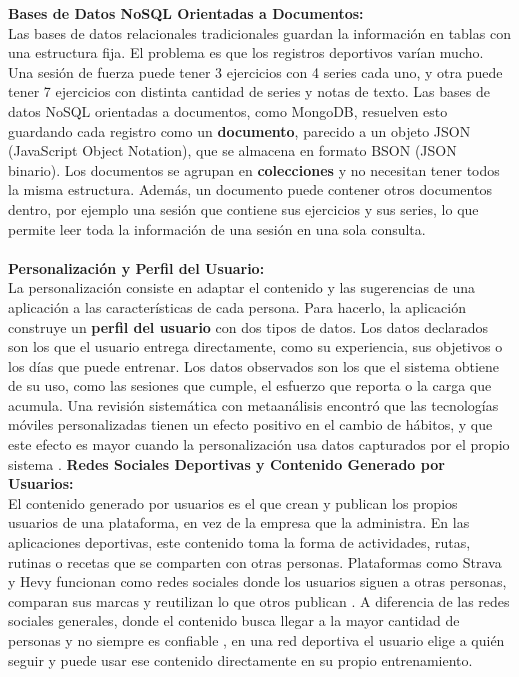 \vspace{0.3cm}
\textbf{Bases de Datos NoSQL Orientadas a Documentos:}\\
Las bases de datos relacionales tradicionales guardan la información en tablas con una estructura fija. El problema es que los registros deportivos varían mucho. Una sesión de fuerza puede tener 3 ejercicios con 4 series cada uno, y otra puede tener 7 ejercicios con distinta cantidad de series y notas de texto. Las bases de datos NoSQL orientadas a documentos, como MongoDB, resuelven esto guardando cada registro como un \textbf{documento}, parecido a un objeto JSON (JavaScript Object Notation), que se almacena en formato BSON (JSON binario). Los documentos se agrupan en \textbf{colecciones} y no necesitan tener todos la misma estructura. Además, un documento puede contener otros documentos dentro, por ejemplo una sesión que contiene sus ejercicios y sus series, lo que permite leer toda la información de una sesión en una sola consulta.
\\\\
\textbf{Personalización y Perfil del Usuario:}\\
La personalización consiste en adaptar el contenido y las sugerencias de una aplicación a las características de cada persona. Para hacerlo, la aplicación construye un \textbf{perfil del usuario} con dos tipos de datos. Los datos declarados son los que el usuario entrega directamente, como su experiencia, sus objetivos o los días que puede entrenar. Los datos observados son los que el sistema obtiene de su uso, como las sesiones que cumple, el esfuerzo que reporta o la carga que acumula. Una revisión sistemática con metaanálisis encontró que las tecnologías móviles personalizadas tienen un efecto positivo en el cambio de hábitos, y que este efecto es mayor cuando la personalización usa datos capturados por el propio sistema \citep{tong2021personalized}.
\textbf{Redes Sociales Deportivas y Contenido Generado por Usuarios:}\\
El contenido generado por usuarios es el que crean y publican los propios usuarios de una plataforma, en vez de la empresa que la administra. En las aplicaciones deportivas, este contenido toma la forma de actividades, rutas, rutinas o recetas que se comparten con otras personas. Plataformas como Strava y Hevy funcionan como redes sociales donde los usuarios siguen a otras personas, comparan sus marcas y reutilizan lo que otros publican \citep{strava_segments, hevy_social}. A diferencia de las redes sociales generales, donde el contenido busca llegar a la mayor cantidad de personas y no siempre es confiable \citep{sabbagh2020credibility}, en una red deportiva el usuario elige a quién seguir y puede usar ese contenido directamente en su propio entrenamiento.

